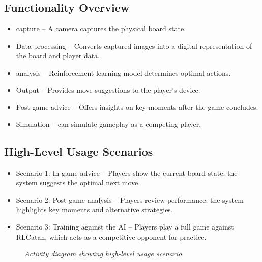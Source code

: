 \documentclass{article}
\begin{document}
\subsection{Functionality Overview}\label{subsec:functionality-overview}
\begin{itemize}
    \item {\GameState{} capture} – A camera captures the physical board state.
    \item {Data processing} – Converts captured images into a digital representation of the board and player data.
    \item {\AI{} analysis} – Reinforcement learning model determines optimal actions.
    \item {Output} – Provides move suggestions to the player's device.
    \item {Post-game advice} – Offers insights on key moments after the game concludes.
    \item {Simulation} – \AI{} can simulate gameplay as a competing player.
\end{itemize}

\subsection{High-Level Usage Scenarios}\label{subsec:high-level-usage-scenarios}
\begin{itemize}
    \item {Scenario 1: In-game advice} – Players show the current board state; the system suggests the optimal next move.
    \item {Scenario 2: Post-game analysis} – Players review performance; the system highlights key moments and alternative strategies.
    \item {Scenario 3: Training against the AI} – Players play a full game against RLCatan, which acts as a competitive opponent for practice.
\end{itemize}
\begin{figure}[H]
    \caption{\textit{Activity diagram showing high-level usage scenario}}
    \label{fig:activity-diagram}
\end{figure}
\end{document}
